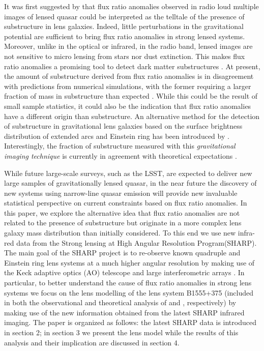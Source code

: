 \documentclass[usenatbib]{mn2e}
\begin{document}
It was first suggested by \citet{Mao1998} that flux ratio anomalies observed in radio loud multiple images of lensed quasar could be interpreted as the telltale of the presence of substructure in lens galaxies.
Indeed, little perturbations in the gravitational potential are sufficient to bring flux ratio anomalies in strong lensed systems. 
Moreover, unlike in the optical or infrared, in the radio band, lensed images are not sensitive to micro lensing from stars nor dust extinction. 
This makes flux ratio anomalies a promising tool to detect dark matter substructures \citep{Dalal2002, N13}.  
At present, the amount of substructure derived from flux ratio anomalies is in disagreement with predictions from numerical simulations, with the former requiring a larger fraction of mass in substructure than expected \citet{Xu14}. While this could be the result of small sample statistics, it could also be the indication that flux ratio anomalies have a different origin than substructure. An alternative method for the detection of substructure in gravitational lens galaxies based on the surface brightness distribution of extended arcs and Einstein ring has been introduced by \citet{K05,V09}. Interestingly, the fraction of substructure measured with this \emph{gravitational imaging technique} is currently in agreement with theoretical expectations \citep{V14a}.

While future large-scale surveys, such as the LSST, are
  expected to deliver new large samples of gravitationally lensed
  quasar, in the near future the discovery of new systems using
narrow-line quasar emission \citep{N14} will provide new
  invaluable statistical perspective on current constraints based on
  flux ratio anomalies.  In this paper, we explore the alternative
  idea that flux ratio anomalies are not related to the presence of
  substructure but originate in a more complex lens galaxy mass
  distribution than initially considered. To this end we use new
  infra-red data from the Strong lensing at High Angular Resolution
  Program(SHARP). The main goal of the SHARP project is to
  re-observe known quadruple and Einstein ring lens systems at a much
higher angular resolution by making use of the Keck adaptive optics
(AO) telescope and large interferometric arrays \citep{SHARP12,V12}
. In particular, to better understand the cause of flux ratio
anomalies in strong lens systems we focus on the lens
  modelling of the lens system B1555+375 (included in both the
  observational and theoretical analysis of \citet{Dalal2002} and
  \citet{Xu14}, respectively) by making use of the new information
obtained from the latest SHARP infrared imaging. The paper is
  organized as follows: the latest SHARP data is introduced in section
  2; in section 3 we present the lens model while the results of this
  analysis and their implication are discussed in section 4.
\end{document}
